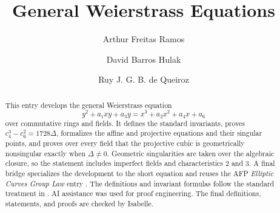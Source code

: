 \documentclass[11pt,a4paper]{article}
\begin{document}
\title{General Weierstrass Equations}
\author{Arthur Freitas Ramos \and David Barros Hulak \and Ruy J. G. B. de Queiroz}
\maketitle

\begin{abstract}
This entry develops the general Weierstrass equation
\[
  y^2+a_1xy+a_3y=x^3+a_2x^2+a_4x+a_6
\]
over commutative rings and fields.  It defines the standard invariants, proves
$c_4^3-c_6^2=1728\Delta$, formalizes the affine and projective equations and
their singular points, and proves over every field that the projective cubic is
geometrically nonsingular exactly when $\Delta\ne0$.  Geometric singularities
are taken over the algebraic closure, so the statement includes imperfect
fields and characteristics $2$ and $3$.  A final bridge specializes the
development to the short equation and reuses the AFP
\emph{Elliptic Curves Group Law} entry \cite{Elliptic-Curves-Group-Law-AFP}.
The definitions and invariant formulas follow the standard treatment in
\cite{Silverman2009}.
AI assistance was used for proof engineering.  The final definitions,
statements, and proofs are checked by Isabelle.
\end{abstract}

\tableofcontents





\end{document}
